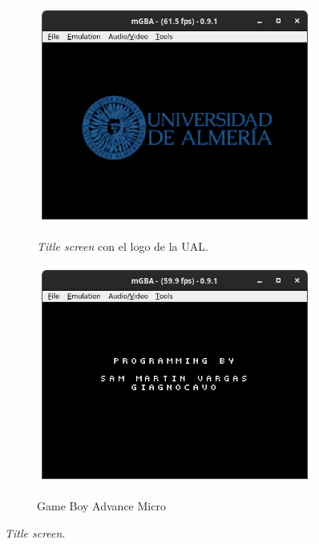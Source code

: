 \begin{figure}[h]
	\centering
	\begin{subfigure}[b]{0.45\textwidth}
		\centering
		\includegraphics[width=\textwidth]{capitulos/capitulo5/game_0.png}
		\label{fig:credit_logo}
		\caption{\textit{Title screen} con el logo de la UAL.}
	\end{subfigure}
	\hfill
	\begin{subfigure}[b]{0.45\textwidth}
		\centering
		\includegraphics[width=\textwidth]{capitulos/capitulo5/game_1.png}
		\label{fig:credit_nombre}
		\caption{Game Boy Advance Micro}
	\end{subfigure}
	\caption{\textit{Title screen}.}
	\label{fig:credits}
\end{figure}
\FloatBarrier{}

